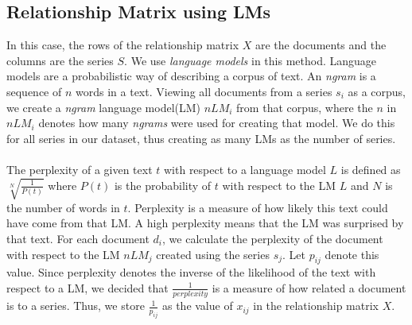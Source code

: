 \documentclass[11pt]{article}
\begin{document}
\subsection{Relationship Matrix using LMs}
In this case, the rows of the relationship matrix $X$ are the documents and the columns are the series $S$. We use \emph{language models} in this method. Language models are a probabilistic way of describing a corpus of text. An \emph{ngram} is a sequence of $n$ words in a text. Viewing all documents from a series $s_i$ as a corpus, we create a \emph{ngram} language model(LM) $nLM_i$ from that corpus, where the $n$ in $nLM_i$ denotes how many \emph{ngrams} were used for creating that model. We do this for all series in our dataset, thus creating as many LMs as the number of series.\\\\
The perplexity of a given text $t$ with respect to a language model $L$ is defined as $\sqrt[N]{\frac{1}{P(t)}}$ where $P(t)$ is the probability of $t$ with respect to the LM $L$ and $N$ is the number of words in $t$. Perplexity is a measure of how likely this text could have come from that LM. A high perplexity means that the LM was surprised by that text.
For each document $d_i$, we calculate the perplexity of the document with respect to the LM $nLM_j$ created using the series $s_j$. Let $p_{ij}$ denote this value.
Since perplexity denotes the inverse of the likelihood of the text with respect to a LM, we decided that $\frac{1}{perplexity}$ is a measure of how related a document is to a series. Thus, we store $\frac{1}{p_{ij}}$ as the value of $x_{ij}$ in the relationship matrix $X$.
\end{document}
